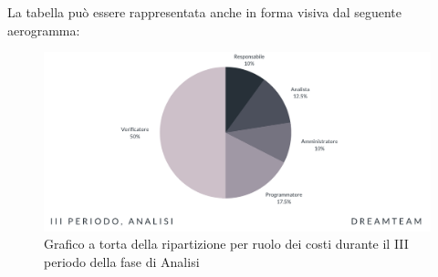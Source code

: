 La tabella può essere rappresentata anche in forma visiva dal seguente aerogramma:

\begin{figure}[H]
\centering
\includegraphics[scale=0.65]{Sezioni/SezioniPreventivo/grafici/Analisi_III_periodo_costi.png}
\caption{Grafico a torta della ripartizione per ruolo dei costi durante il III periodo della fase di Analisi}
\end{figure}


